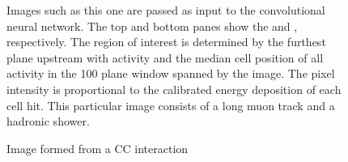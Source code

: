 \begin{figure}
\begin{center}
\begin{subfigure}[c]{0.7\textwidth}
\vspace{-20pt}
\caption*{\yview}
\end{subfigure}
\vspace{-10pt}
\end{center}
\caption{Image formed from a \nue CC interaction}{
Images such as this one are passed as input to the convolutional neural network.
The top and bottom panes show the \xview and \yview, respectively.
The region of interest is determined by the furthest plane upstream with
activity and the median cell position of all activity
in the 100 plane window spanned by the image.
The pixel intensity is proportional to the calibrated energy deposition
of each cell hit.
This particular image consists of a long muon track and a hadronic shower.}
\label{pixnue}

\end{figure}

